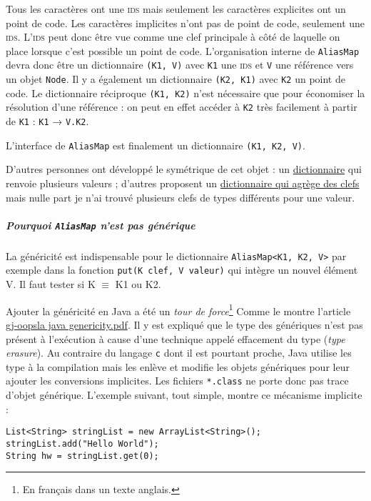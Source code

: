 \documentclass[12pt,onecolumn]{article}
\begin{document}
Tous les caractères ont une \textsc{ids} mais seulement les caractères explicites ont un point de code. Les caractères implicites n'ont pas de point de code, seulement une \textsc{ids}. L'\textsc{ids} peut donc être vue comme une clef principale à côté de laquelle on place lorsque c'est possible un point de code. L'organisation interne de \texttt{AliasMap} devra donc être un dictionnaire \texttt{(K1, V)} avec \texttt{K1} une \textsc{ids} et \texttt{V} une référence vers un objet \texttt{Node}. Il y a également un dictionnaire \texttt{(K2, K1)} avec \texttt{K2} un point de code. Le dictionnaire réciproque \texttt{(K1, K2)} n'est nécessaire que pour économiser la résolution d'une référence : on peut en effet accéder à \texttt{K2} très facilement à partir de \texttt{K1} : \texttt{K1} → \texttt{V.K2}.

L'interface de \texttt{AliasMap} est finalement un dictionnaire \texttt{(K1, K2, V)}.

D'autres personnes ont développé le symétrique de cet objet : un \href{https://github.com/megamattron/collections-generic/blob/master/src/java/org/apache/commons/collections15/MultiMap.java}{dictionnaire} qui renvoie plusieurs valeurs ; d'autres proposent un \href{https://github.com/megamattron/collections-generic/blob/master/src/java/org/apache/commons/collections15/keyvalue/MultiKey.java}{dictionnaire qui agrège des clefs} mais nulle part je n'ai trouvé plusieurs clefs de types différents pour une valeur.

\subparagraph{Pourquoi \texttt{AliasMap} n'est pas générique}
La généricité est indispensable pour le dictionnaire \texttt{AliasMap<K1, K2, V>} par exemple dans la fonction \texttt{put(K clef, V valeur)} qui intègre un nouvel élément V. Il faut tester si K $\equiv$ K1 ou K2.

Ajouter la généricité en Java a été un \textsl{tour de force}\footnote{En français dans un texte anglais.} Comme le montre l'article \href{https://github.com/piotr2b/chinese-huawen/raw/master/gj-oopsla\%20java\%20genericity.pdf}{gj-oopsla java genericity.pdf}. Il y est expliqué que le type des génériques n'est pas présent à l'exécution à cause d'une technique appelé effacement du type (\textsl{type erasure}). Au contraire du langage \texttt{c} dont il est pourtant proche, Java utilise les type à la compilation mais les enlève et modifie les objets génériques pour leur ajouter les conversions implicites. Les fichiers \texttt{*.class} ne porte donc pas trace d'objet générique. L'exemple suivant, tout simple, montre ce mécanisme implicite :
\begin{lstlisting}[caption={Code en Java (après 1.5)}]
List<String> stringList = new ArrayList<String>();
stringList.add("Hello World");
String hw = stringList.get(0);
\end{lstlisting}
\end{document}
